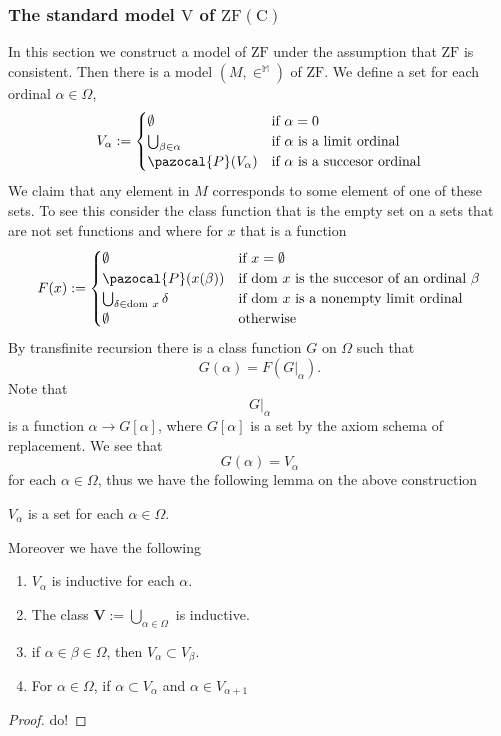 \subsubsection{The standard model $\mathrm{V}$ of $\mathrm{ZF(C)}$}
In this section we construct a model of $\mathrm{ZF}$ under the assumption that $\mathrm{ZF}$ is consistent. Then there is a model $(M,\in^\mathbb{M})$ of $\mathrm{ZF}$. We define a set for each ordinal $\alpha\in \Omega$,
$$
    V_\alpha := 
    \begin{cases}
        \emptyset & \text{if } \alpha = 0\\
        \bigcup_{\beta \in \alpha} & \text{if } \alpha \text{ is a limit ordinal}\\
        \pazocal{P}(V_\alpha) & \text{if } \alpha \text{ is a succesor ordinal}
    \end{cases}
$$ 
We claim that any element in $M$ corresponds to some element of one of these sets. To see this consider the class function that is the empty set on a sets that are not set functions and where for $x$ that is a function 
$$
    F(x):=
    \begin{cases}
        \emptyset & \text{if } x=\emptyset\\
        \pazocal{P}(x(\beta)) & \text{if } \dom\ x \text{ is the succesor of an ordinal } \beta\\
        \bigcup_{\delta\in \dom\ x} \delta & \text{if }\dom \ x \text{ is a nonempty limit ordinal}\\
        \emptyset & \text{otherwise} 
    \end{cases}
$$
By transfinite recursion there is a class function $G$ on $\Omega$ such that 
$$G(\alpha) = F\left(\left.G\right|_\alpha\right).$$
Note that 
$$\left. G\right|_\alpha$$
is a function $\alpha \rightarrow G[\alpha]$, where $G[\alpha]$ is a set by the axiom schema of replacement. We see that 
$$G(\alpha) = V_\alpha$$
for each $\alpha\in \Omega$, thus we have the following lemma on the above construction
\begin{lemma}
    $V_\alpha$ is a set for each $\alpha\in \Omega$.
\end{lemma}
Moreover we have the following
\begin{lemma}
    \begin{enumerate}
        \item $V_\alpha$ is inductive for each $\alpha$.
        \item The class $\mathbf{V}:= \bigcup_{\alpha\in \Omega}$ is inductive.
        \item if $\alpha\in \beta\in \Omega$, then $V_\alpha\subset V_\beta$.
        \item For $\alpha\in \Omega$, if $\alpha\subset V_\alpha$ and $\alpha\in V_{\alpha+1}$
    \end{enumerate}
\end{lemma}
\begin{proof}
    {\Large do!}
\end{proof}
